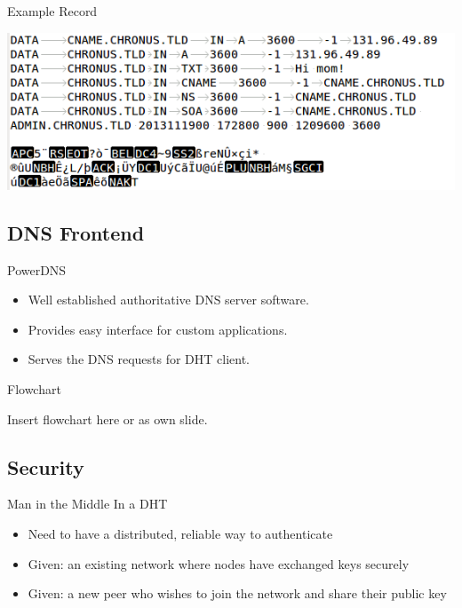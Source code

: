 \documentclass[11pt]{beamer}
\begin{document}
\begin{frame}{Example Record}
	\begin{center}
\includegraphics[width=0.7\linewidth]{figs/record}
\end{center}

\end{frame}



\subsection{DNS Frontend}
\begin{frame}{PowerDNS}
\begin{itemize}
	\item Well established authoritative DNS server software.	
	\item Provides easy interface for custom applications.
	\item Serves the DNS requests for DHT client.
\end{itemize}

\end{frame}

\begin{frame}{Flowchart}
	
	Insert flowchart here or as own slide.
	
\end{frame}



\subsection{Security}

\begin{frame}{Man in the Middle In a DHT}
	
	\begin{itemize}
		\item Need to have a distributed, reliable way to authenticate 
		\item  Given: an existing network where nodes have exchanged keys securely
		\item  Given: a new peer who wishes to join the network and share their public key
		
	\end{itemize}
	
	
\end{frame}
\end{document}
